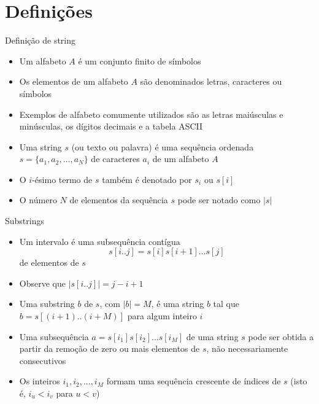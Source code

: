 \section{Definições}

\begin{frame}[fragile]{Definição de string}

    \begin{itemize}
        \item Um alfabeto $A$ é um conjunto finito de símbolos

        \item Os elementos de um alfabeto $A$ são denominados letras, caracteres ou símbolos

        \item Exemplos de alfabeto comumente utilizados são as letras maiúsculas e minúsculas, 
            os dígitos decimais e a tabela ASCII

        \item Uma string $s$ (ou texto ou palavra) é uma sequência ordenada $s = \lbrace a_1, a_2, 
        \ldots, a_N\rbrace$ de caracteres $a_i$ de um alfabeto $A$

        \item O $i$-ésimo termo de $s$ também é denotado por $s_i$ ou $s[i]$

        \item O número $N$ de elementos da sequência $s$ pode ser notado como $|s|$

    \end{itemize}

\end{frame}


\begin{frame}[fragile]{Substrings}

    \begin{itemize}
        \item Um intervalo é uma subsequência contígua 
        \[
            s[i..j] = s[i]s[i+1]\ldots s[j]
        \] de elementos de $s$

        \item Observe que $|s[i..j]| = j - i + 1$ 

        \item Uma substring $b$ de $s$, com $|b| = M$, é uma string $b$ tal que $b = s[(i+1)..(i+M)]$ 
            para algum inteiro $i$

        \item Uma subsequência $a = s[i_1]s[i_2]\ldots s[i_M]$ de uma string $s$ pode ser obtida a 
            partir da remoção de zero ou mais elementos de $s$, não necessariamente consecutivos

        \item Os inteiros $i_1, i_2, ..., i_M$ formam uma sequência crescente de índices de $s$ 
            (isto é, $i_u < i_v$ para $u < v$)
    \end{itemize}

\end{frame}


